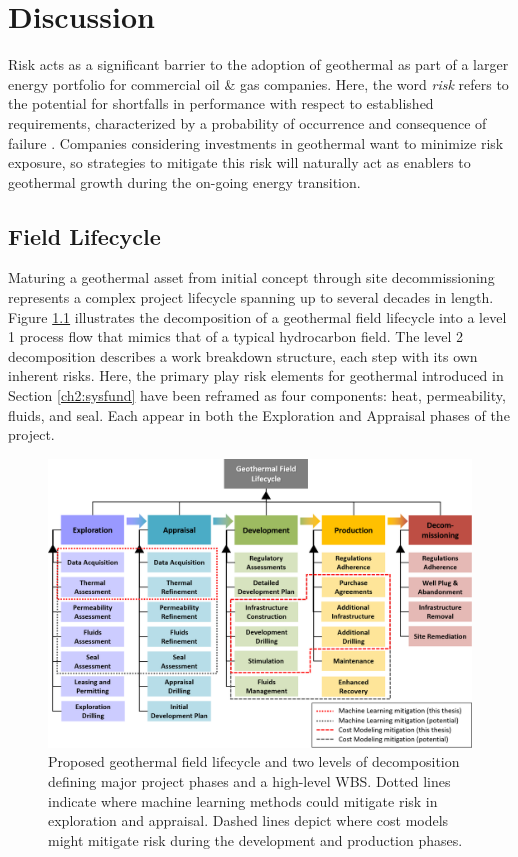 \chapter{Discussion}\label{ch7:discuss}
\label{ch7:discussion}
Risk acts as a significant barrier to the adoption of geothermal as part of a larger energy portfolio for commercial oil \& gas companies. Here, the word \textit{risk} refers to the potential for shortfalls in performance with respect to established requirements, characterized by a probability of occurrence and consequence of failure \citep{nasa_s3001_2017, malone_development_2004}.  Companies considering investments in geothermal want to minimize risk exposure, so strategies to mitigate this risk will naturally act as enablers to geothermal growth during the on-going energy transition.

\section{Field Lifecycle}\label{ch7:field_lifecycle}
Maturing a geothermal asset from initial concept through site decommissioning represents a complex project lifecycle spanning up to several decades in length. Figure \ref{fig:geothermal_field_lifecycle} illustrates the decomposition of a geothermal field lifecycle into a level 1 process flow that mimics that of a typical hydrocarbon field. The level 2 decomposition describes a work breakdown structure, each step with its own inherent risks. Here, the primary play risk elements for geothermal introduced in Section \ref{ch2:sysfund} have been reframed as four components: heat, permeability, fluids, and seal. Each appear in both the Exploration and Appraisal phases of the project. 

\begin{figure}
\centering
\includegraphics[width=\textwidth]{templates/images/Figure-SystemDecomposition.png}
\caption[Geothermal field lifecycle]{Proposed geothermal field lifecycle and two levels of decomposition defining major project phases and a high-level WBS. Dotted lines indicate where machine learning methods could mitigate risk in exploration and appraisal. Dashed lines depict where cost models might mitigate risk during the development and production phases.}
\label{fig:geothermal_field_lifecycle}
\end{figure}

